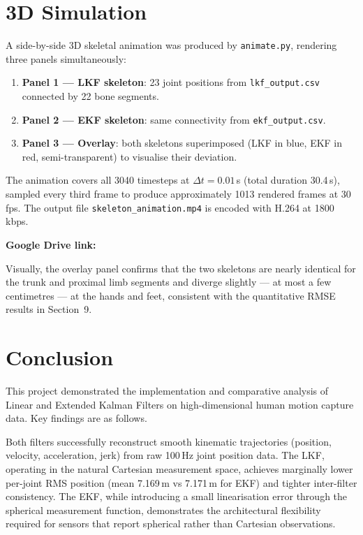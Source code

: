 \documentclass[12pt, a4paper]{article}
\begin{document}
\section{3D Simulation}

A side-by-side 3D skeletal animation was produced by \texttt{animate.py}, rendering three panels simultaneously:
\begin{enumerate}[noitemsep]
  \item \textbf{Panel 1 — LKF skeleton}: 23 joint positions from \texttt{lkf\_output.csv} connected by 22 bone segments.
  \item \textbf{Panel 2 — EKF skeleton}: same connectivity from \texttt{ekf\_output.csv}.
  \item \textbf{Panel 3 — Overlay}: both skeletons superimposed (LKF in blue, EKF in red, semi-transparent) to visualise their deviation.
\end{enumerate}

The animation covers all 3040 timesteps at $\Delta t = 0.01\,$s (total duration 30.4\,s), sampled every third frame to produce approximately 1013 rendered frames at 30\,fps. The output file \texttt{skeleton\_animation.mp4} is encoded with H.264 at 1800\,kbps.

\textbf{Google Drive link:} 

Visually, the overlay panel confirms that the two skeletons are nearly identical for the trunk and proximal limb segments and diverge slightly — at most a few centimetres — at the hands and feet, consistent with the quantitative RMSE results in Section~9.

\section{Conclusion}

This project demonstrated the implementation and comparative analysis of Linear and Extended Kalman Filters on high-dimensional human motion capture data. Key findings are as follows.

Both filters successfully reconstruct smooth kinematic trajectories (position, velocity, acceleration, jerk) from raw 100\,Hz joint position data. The LKF, operating in the natural Cartesian measurement space, achieves marginally lower per-joint RMS position (mean 7.169\,m vs 7.171\,m for EKF) and tighter inter-filter consistency. The EKF, while introducing a small linearisation error through the spherical measurement function, demonstrates the architectural flexibility required for sensors that report spherical rather than Cartesian observations.
\end{document}
